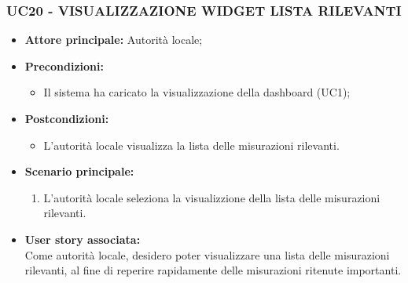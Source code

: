 \subsubsection{UC20 - VISUALIZZAZIONE WIDGET LISTA RILEVANTI}
\begin{itemize}
      \item \textbf{Attore principale:} Autorità locale;
      \item \textbf{Precondizioni:}
            \begin{itemize}
                  \item Il sistema ha caricato la visualizzazione della dashboard (UC1);
            \end{itemize}
      \item \textbf{Postcondizioni:}
            \begin{itemize}
                  \item L'autorità locale visualizza la lista delle misurazioni rilevanti.
            \end{itemize}
      \item \textbf{Scenario principale:}
            \begin{enumerate}
                  \item L'autorità locale seleziona la visualizzione della lista delle misurazioni rilevanti.
            \end{enumerate}
      \item \textbf{User story associata:} \\
      Come autorità locale, desidero poter visualizzare una lista delle misurazioni rilevanti, al fine di reperire rapidamente delle misurazioni ritenute importanti.
\end{itemize}